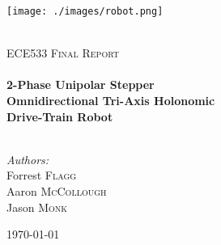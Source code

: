 \begin{titlepage}

\begin{center}
\texttt{[image: ./images/robot.png]}

\textsc{\LARGE }\\[1.5cm]

\textsc{\Large ECE533 Final Report}\\[0.5cm]


\HRule \\[0.4cm]
{ \LARGE \bfseries 2-Phase Unipolar Stepper\\
Omnidirectional Tri-Axis Holonomic \\
\vspace{3mm}
Drive-Train Robot}\\[0.4cm]

\HRule \\[1.5cm]

\begin{minipage}{0.4\textwidth}
\begin{center} \large
\emph{Authors:}\\
Forrest \textsc{Flagg}\\
Aaron \textsc{McCollough}\\
Jason \textsc{Monk}\\
\end{center}
\end{minipage}

\vfill

{\large \today}

\end{center}
\end{titlepage}
